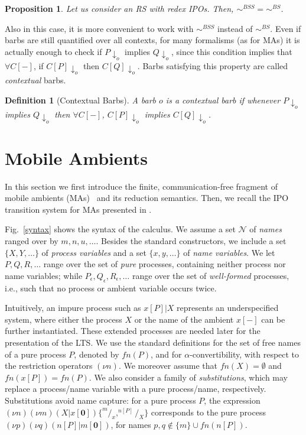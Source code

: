 \documentclass[copyright,creativecommons]{eptcs}
\newcommand{\nil}{\mathbf{0}}
\newcommand{\barb}[1]{\downarrow_{#1}}
\newcommand{\bsbis}{\sim^{BS}}
\newcommand{\bssbis}{\sim^{BSS}}
\newcommand{\<}{\langle}
\renewcommand{\>}{\rangle}
\newtheorem{definition}{Definition}{}
\newtheorem{proposition}{Proposition}{}
\begin{document}
\begin{proposition} \label{PropBSS=BS}
Let us consider an RS with redex IPOs. Then,
 $\bssbis=\bsbis$.
\end{proposition}

Also in this case, it is more convenient to work with $\bssbis$
instead of $\bsbis$. Even if barbs are still quantified over all
contexts, for many formalisms (as for MAs) it is actually enough to
check if $P\barb{o}$ implies $Q\barb{o}$, since this condition
implies that $\forall C[-]$, if $C[P]\barb{o}$ then $C[Q]\barb{o}$.
Barbs satisfying this property are called \emph{contextual} barbs.

\begin{definition}[Contextual Barbs] \label{contBarb}
A barb $o$ is a \emph{contextual barb} if whenever
$P\barb{o}$ implies $Q\barb{o}$ then $\forall C[-]$, $C[P]\barb{o}$
implies $C[Q]\barb{o}$.
\end{definition}



\section{Mobile Ambients} \label{sec:MA}

In this section we first introduce the finite, communication-free fragment
of mobile ambients (MAs)~\cite{CG:MAmb} and its reduction semantics.
Then, we recall the IPO transition system for MAs presented in \cite{BoGaMo}.

Fig.~\ref{syntax} shows the syntax of the calculus. We assume a set
$\mathcal N$ of \emph{names} ranged over by $m, n, u, \ldots$.
Besides the standard constructors, we include a set $\{X, Y, \ldots\}$
of \emph{process variables} and a set $\{x, y, \dots\}$ of \emph{name
  variables}.
We let $P,Q,R, \ldots$ range over the set of \emph{pure} processes,
containing neither process nor name variables; while $P_\epsilon,
Q_\epsilon, R_\epsilon, \ldots$ range over the set of
\emph{well-formed} processes, i.e., such that no process or ambient
variable occurs twice.

Intuitively, an impure process such as $x[P] | X$ represents an
underspecified system, where either the process $X$ or the name
of the ambient $x[-]$ can be further instantiated. These extended
processes are needed later for the presentation of the LTS.
We use the standard definitions for the set of free names of a pure
process $P$, denoted by $fn (P)$, and for $\alpha$-convertibility,
with respect to the restriction operators $(\nu n)$. We moreover
assume that $fn(X)=\emptyset$ and $fn(x[P])= fn(P)$.
We also consider a family of \emph{substitutions}, which may replace a
process/name variable with a pure process/name, respectively.
Substitutions avoid name capture: for a pure process $P$, the
expression
$(\nu n)(\nu m)(X | x[\nil])\lbrace ^m/_x , ^{n[P]}/_X \rbrace$
corresponds to the pure process
$(\nu p)(\nu q)(n[P] | m[\nil])$,
for names $p, q \not \in \{m\} \cup fn(n[P])$.
\end{document}
